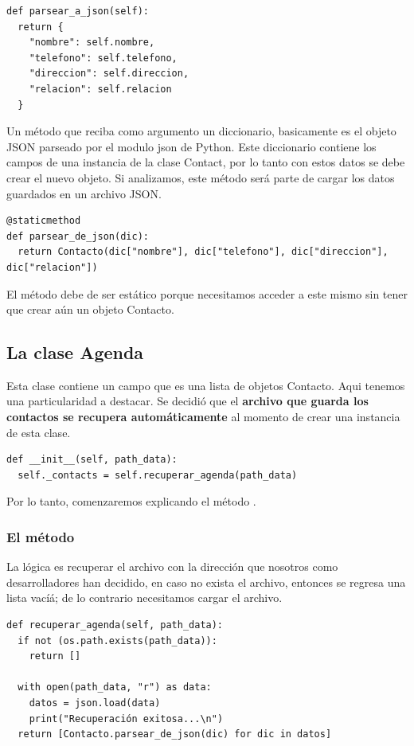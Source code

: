 \begin{verbatim}
def parsear_a_json(self):
  return {
    "nombre": self.nombre,
    "telefono": self.telefono,
    "direccion": self.direccion,
    "relacion": self.relacion
  }
\end{verbatim}

Un método que reciba como argumento un diccionario, basicamente es el objeto JSON parseado por el modulo json de Python. Este diccionario contiene los campos de una instancia de la clase Contact, por lo tanto con estos datos se debe crear el nuevo objeto. Si analizamos, este método será parte de cargar los datos guardados en un archivo JSON.

\begin{verbatim}
@staticmethod
def parsear_de_json(dic):
  return Contacto(dic["nombre"], dic["telefono"], dic["direccion"], dic["relacion"])
\end{verbatim}

El método debe de ser estático porque necesitamos acceder a este mismo sin tener que crear aún un objeto Contacto.

\subsection{La clase Agenda}
Esta clase contiene un campo  que es una lista de objetos Contacto. Aqui tenemos una particularidad a destacar. Se decidió que el \textbf{archivo que guarda los contactos se recupera automáticamente} al momento de crear una instancia de esta clase.

\begin{verbatim}
def __init__(self, path_data):
  self._contacts = self.recuperar_agenda(path_data)
\end{verbatim}

Por lo tanto, comenzaremos explicando el método .

\subsubsection{El método }
La lógica es recuperar el archivo con la dirección que nosotros como desarrolladores han decidido, en caso no exista el archivo, entonces se regresa una lista vacíá; de lo contrario necesitamos cargar el archivo.

\begin{verbatim}
def recuperar_agenda(self, path_data):
  if not (os.path.exists(path_data)):
    return []

  with open(path_data, "r") as data: 
    datos = json.load(data)
    print("Recuperación exitosa...\n")
  return [Contacto.parsear_de_json(dic) for dic in datos]
\end{verbatim}

